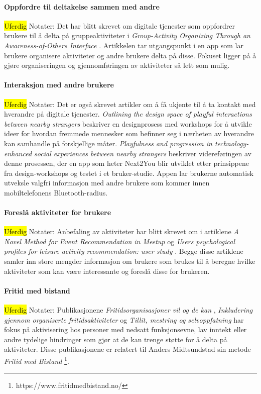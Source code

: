 \paragraph{Oppfordre til deltakelse sammen med andre}
\hl{Uferdig}
Notater:
Det har blitt skrevet om digitale tjenester som oppfordrer brukere til å delta på gruppeaktiviteter i {\em Group-Activity Organizing Through an Awareness-of-Others Interface} \cite{AWARENESS:3:CSCW18}. Artikkelen tar utgangspunkt i en app som lar brukere organisere aktiviteter og andre brukere delta på disse. Fokuset ligger på å gjøre organiseringen og gjennomføringen av aktiviteter så lett som mulig.

\paragraph{Interaksjon med andre brukere}
\hl{Uferdig}
Notater:
Det er også skrevet artikler om å få ukjente til å ta kontakt med hverandre på digitale tjenester. {\em Outlining the design space of playful interactions between nearby strangers} \cite{NEARBY:5:AM16} beskriver en designprosess med workshops for å utvikle ideer for hvordan fremmede mennesker som befinner seg i nærheten av hverandre kan samhandle på forskjellige måter. {\em Playfulness and progression in technology-enhanced social experiences between nearby strangers} \cite{PLAYFUL:6:NORDICHI18} beskriver videreføringen av denne prosessen, der en app som heter Next2You blir utviklet etter prinsippene fra design-workshops og testet i et bruker-studie. Appen lar brukerne automatisk utveksle valgfri informasjon med andre brukere som kommer innen mobiltelefonens Bluetooth-radius.

\paragraph{Foreslå aktiviteter for brukere}
\hl{Uferdig}
Notater:
Anbefaling av aktiviteter har blitt skrevet om i artiklene {\em A Novel Method for Event Recommendation in Meetup} \cite{MEETUP:7:ASONAM17} og {\em Users psychological profiles for leisure activity recommendation: user study} \cite{PROFILES:10:CITREC17}. Begge disse artiklene samler inn store mengder informasjon om brukere som brukes til å beregne hvilke aktiviteter som kan være interessante og foreslå disse for brukeren.

\paragraph{Fritid med bistand}
\hl{Uferdig}
Notater:
Publikasjonene {\em Fritidsorganisasjoner vil og de kan} \cite{FRITID:12}, {\em Inkludering gjennom organiserte fritidsaktiviteter} \cite{INKLUDERING:11} og {\em Tillit, mestring og selvoppfatning} \cite{TILLIT:13} har fokus på aktivisering hos personer med nedsatt funksjonsevne, lav inntekt eller andre tydelige hindringer som gjør at de kan trenge støtte for å delta på aktiviteter. Disse publikasjonene er relatert til Anders Midtsundstad sin metode {\em Fritid med Bistand} \footnote{https://www.fritidmedbistand.no/}. 
